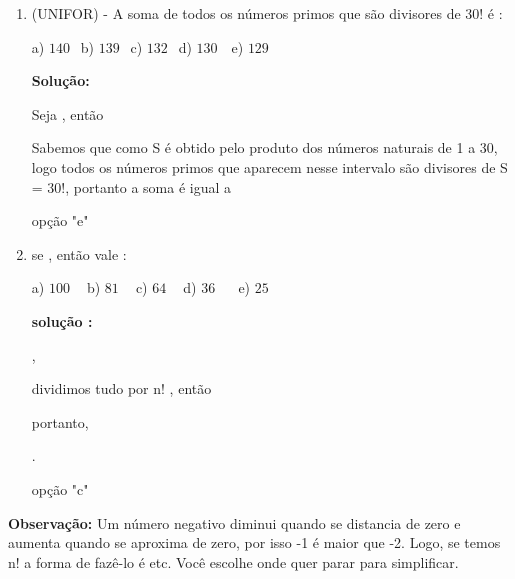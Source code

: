 \begin{multicols*}{2}
\begin{enumerate}
\begin{enumerate}
			            \\


			      \item (UNIFOR) - A soma de todos os números primos que são divisores de 30! é :

			            a) $140 \ \ $ b) $139 \ \ $ c) $132 \ \ $ d) $130 \ \ \ $ e) $129 \ \ $

			            \textbf{Solução:}

			            Seja , então


			            Sabemos que como S é obtido pelo produto dos números naturais de 1 a 30, logo todos os números primos que aparecem nesse intervalo são divisores de S = 30!, portanto a soma  é igual a



			            opção "e"

			      \item se , então  vale :

			            a) $100 \ \ \ \ $ b) $81 \ \ \ \ $ c) $64 \ \ \ \ $ d) $36 \ \ \ \ \ \ $ e) $25 \ \ $

			            \textbf{solução :}


			            ,

			            dividimos tudo por n! , então


			            portanto,

			            .

			            opção "c"

		      \end{enumerate}

		      \textbf{Observação:} Um número negativo diminui quando se distancia de zero e aumenta quando se aproxima de zero, por isso -1 é maior que -2. Logo, se temos n! a forma de fazê-lo é  etc. Você escolhe onde quer parar para simplificar.


\end{enumerate}
\end{multicols*}
